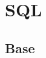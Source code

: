 \documentclass[a4paper]{article}
\begin{document}
\section{SQL}










\subsection{Base}
\end{document}
